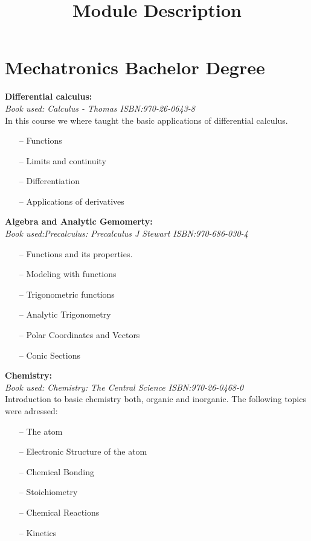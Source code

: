 \documentclass{article}
\begin{document}

\title{Module Description}
\maketitle

\section{Mechatronics Bachelor Degree}
\textbf{Differential calculus:}\\
    \emph{Book used: Calculus - Thomas ISBN:970-26-0643-8}\\
    In this course we where taught the basic applications of differential
    calculus.
    \begin{itemize}
     \setlength\itemsep{0pt}
        \item[--] Functions
        \item[--] Limits and continuity
        \item[--] Differentiation
        \item[--] Applications of derivatives
    \end{itemize}


\setlength{\parindent}{0pt}
\textbf{Algebra and Analytic Gemomerty:}\\
    \emph{Book used:Precalculus: Precalculus J Stewart ISBN:970-686-030-4}
    \begin{itemize}
     \setlength\itemsep{0pt}
        \item[--] Functions and its properties.
        \item[--] Modeling with functions
        \item[--] Trigonometric functions
        \item[--] Analytic Trigonometry
        \item[--] Polar Coordinates and Vectors
        \item[--] Conic Sections
    \end{itemize}

\textbf{Chemistry:}\\
    \emph{Book used: Chemistry: The Central Science ISBN:970-26-0468-0}\\
    Introduction to basic chemistry both, organic and inorganic.
    The following topics were adressed:
    \begin{itemize}
     \setlength\itemsep{0pt}
    \item[--] The atom
    \item[--] Electronic Structure of the atom
    \item[--] Chemical Bonding
    \item[--] Stoichiometry
    \item[--] Chemical Reactions
    \item[--] Kinetics
    \end{itemize}
\end{document}
